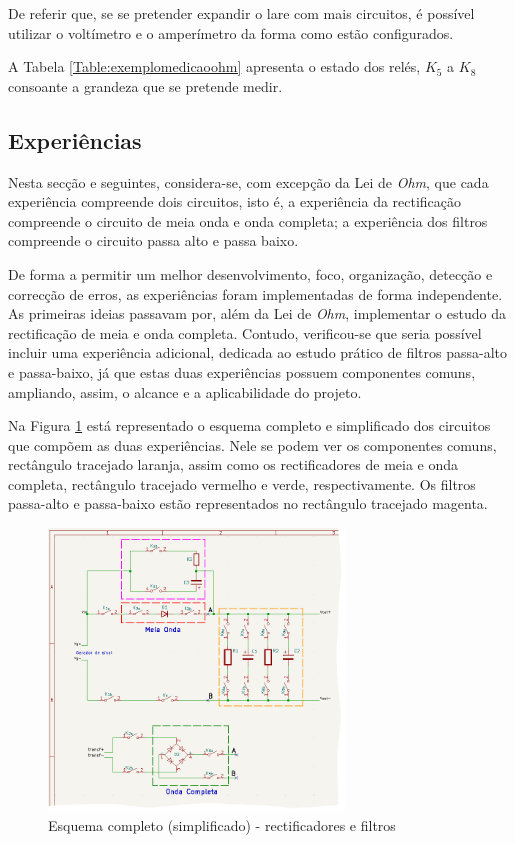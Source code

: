 De referir que, se se pretender expandir o \acrshort{lare} com mais circuitos, é possível utilizar o voltímetro e o amperímetro da forma como estão configurados. 

A Tabela \ref{Table:exemplomedicaoohm} apresenta o estado dos relés, $K_{5}$ a $K_{8}$ consoante a grandeza que se pretende medir.

\subsection{Experiências}
\label{sec:experiencias}
Nesta secção e seguintes, considera-se, com excepção da Lei de \textit{Ohm}, que cada experiência compreende dois circuitos, isto é, a experiência da rectificação compreende o circuito de meia onda e onda completa; a experiência dos filtros compreende o circuito passa alto e passa baixo.

De forma a permitir um melhor desenvolvimento, foco, organização, detecção e correcção de erros, as experiências foram implementadas de forma independente. As primeiras ideias passavam por, além da Lei de \textit{Ohm}, implementar o estudo da rectificação de meia e onda completa. Contudo, verificou-se que seria possível incluir uma experiência adicional, dedicada ao estudo prático de filtros passa-alto e passa-baixo, já que estas duas experiências possuem componentes comuns, ampliando, assim, o alcance e a aplicabilidade do projeto.

Na Figura \ref{fig:rectificacao_filtragem_full} está representado o esquema completo e simplificado dos circuitos que compõem as duas experiências. Nele se podem ver os componentes comuns, rectângulo tracejado laranja, assim como os rectificadores de meia e onda completa, rectângulo tracejado vermelho e verde, respectivamente. Os filtros passa-alto e passa-baixo estão representados no rectângulo tracejado magenta.

\begin{figure}[hbtp]
	\centering
	\includegraphics[width=0.7\textwidth]{figures/rec_fil_FULL.png}
	\caption{Esquema completo (simplificado) - rectificadores e filtros}
	\label{fig:rectificacao_filtragem_full}
\end{figure}

